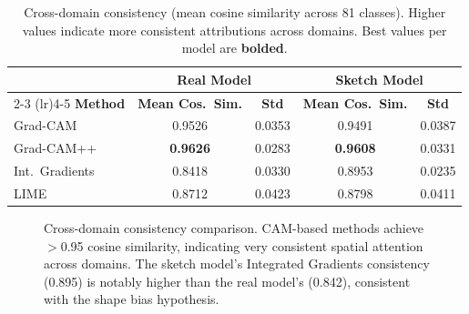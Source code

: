 \documentclass[12pt, a4paper]{article}
\begin{document}
\begin{table}[H]
\centering
\caption{Cross-domain consistency (mean cosine similarity across 81 classes).
Higher values indicate more consistent attributions across domains.
Best values per model are \textbf{bolded}.}
\label{tab:cross_domain}
\begin{tabular}{lcccc}
\toprule
& \multicolumn{2}{c}{\textbf{Real Model}} & \multicolumn{2}{c}{\textbf{Sketch Model}} \\
\cmidrule(lr){2-3} \cmidrule(lr){4-5}
\textbf{Method} & \textbf{Mean Cos.\ Sim.} & \textbf{Std}
& \textbf{Mean Cos.\ Sim.} & \textbf{Std} \\
\midrule
Grad-CAM           & 0.9526 & 0.0353 & 0.9491 & 0.0387 \\
Grad-CAM++         & \textbf{0.9626} & 0.0283 & \textbf{0.9608} & 0.0331 \\
Int.~Gradients     & 0.8418 & 0.0330 & 0.8953 & 0.0235 \\
LIME               & 0.8712 & 0.0423 & 0.8798 & 0.0411 \\
\bottomrule
\end{tabular}
\end{table}

\begin{figure}[H]
\centering
{}
\caption{Cross-domain consistency comparison.  CAM-based methods achieve
$>$0.95 cosine similarity, indicating very consistent spatial attention across
domains.  The sketch model's Integrated Gradients consistency (0.895) is notably
higher than the real model's (0.842), consistent with the shape bias hypothesis.}
\label{fig:cross_domain_bar}
\end{figure}
\end{document}

